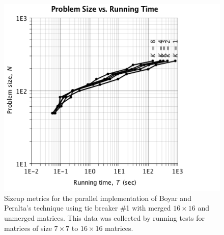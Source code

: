 \begin{figure}
\begin{center}
\includegraphics[scale=0.35]{./chapter_optimize/t1um_size_4.png}
\caption{Sizeup metrics for the parallel implementation of Boyar and Peralta's technique using tie breaker \#1 with merged $16 \times 16$ and unmerged matrices. This data was collected by running tests for matrices of size $7 \times 7$ to $16 \times 16$ matrices.}
\label{fig:sizeup1}
\end{center}


\end{figure}
